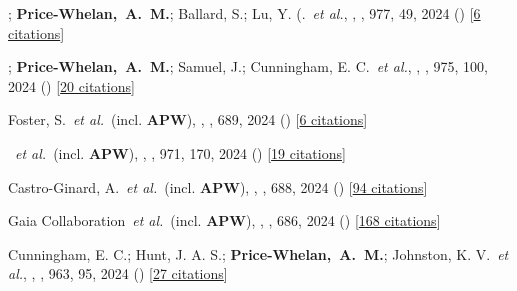 \item[{\color{deemph}\scriptsize131}]; \textbf{Price-Whelan,~A.~M.}; Ballard, S.; Lu, Y. (.~\textit{et al.}, , \apj, 977, 49, 2024 () [\href{http://adsabs.harvard.edu/abs/2024ApJ...977...49S}{6 citations}]

\item[{\color{deemph}\scriptsize130}]; \textbf{Price-Whelan,~A.~M.}; Samuel, J.; Cunningham, E. C.~\textit{et al.}, , \apj, 975, 100, 2024 () [\href{http://adsabs.harvard.edu/abs/2024ApJ...975..100G}{20 citations}]

\item[{\color{deemph}\scriptsize129}]Foster, S.~\textit{et al.}~(incl. \textbf{APW}), , \aanda, 689, 2024 () [\href{http://adsabs.harvard.edu/abs/2024A&A...689A.230F}{6 citations}]

\item[{\color{deemph}\scriptsize128}]~\textit{et al.}~(incl. \textbf{APW}), , \apj, 971, 170, 2024 () [\href{http://adsabs.harvard.edu/abs/2024ApJ...971..170H}{19 citations}]

\item[{\color{deemph}\scriptsize127}]Castro-Ginard, A.~\textit{et al.}~(incl. \textbf{APW}), , \aanda, 688, 2024 () [\href{http://adsabs.harvard.edu/abs/2024A&A...688A...1C}{94 citations}]

\item[{\color{deemph}\scriptsize126}]Gaia Collaboration~\textit{et al.}~(incl. \textbf{APW}), , \aanda, 686, 2024 () [\href{http://adsabs.harvard.edu/abs/2024A&A...686L...2G}{168 citations}]

\item[{\color{deemph}\scriptsize125}]Cunningham, E. C.; Hunt, J. A. S.; \textbf{Price-Whelan,~A.~M.}; Johnston, K. V.~\textit{et al.}, , \apj, 963, 95, 2024 () [\href{http://adsabs.harvard.edu/abs/2024ApJ...963...95C}{27 citations}]

